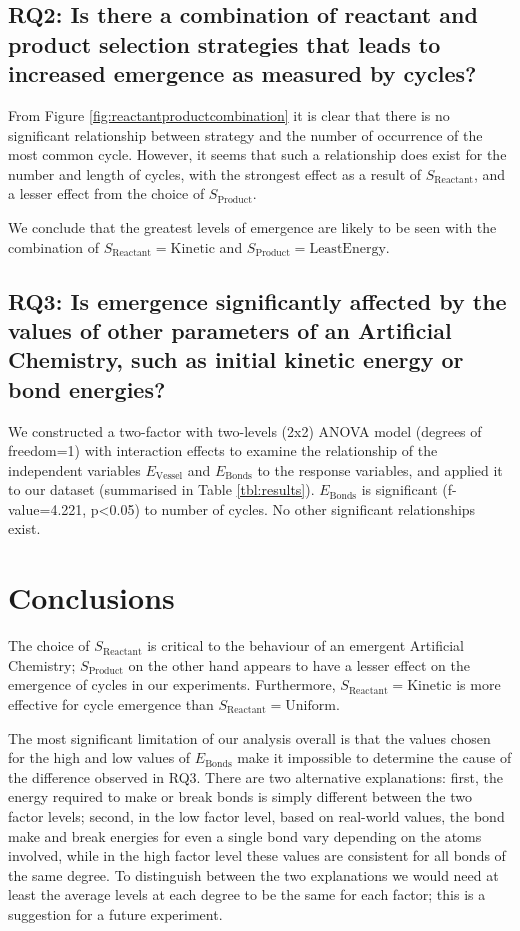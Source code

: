 \subsection{RQ2: Is there a combination of reactant and product selection strategies that leads to increased emergence as measured by cycles?}

From Figure \cref{fig:reactantproductcombination} it is clear that there is no significant relationship between strategy and the number of occurrence of the most common cycle. However, it seems that such a relationship does exist for the number and length of cycles, with the strongest effect as a result of $S_\mathrm{Reactant}$, and a lesser effect from the choice of $S_\mathrm{Product}$.

We conclude that the greatest levels of emergence are likely to be seen with the combination of $S_\mathrm{Reactant} = \mathrm{Kinetic}$ and $S_\mathrm{Product} = \mathrm{LeastEnergy}$.

\subsection{RQ3: Is emergence significantly affected by the values of other parameters of an Artificial Chemistry, such as initial kinetic energy or bond energies?}

We constructed a two-factor with two-levels (2x2) ANOVA model (degrees of freedom=1) with interaction effects to examine the relationship of the independent variables $E_\mathrm{Vessel}$ and $E_\mathrm{Bonds}$ to the response variables, and applied it to our dataset (summarised in Table \cref{tbl:results}). $E_\mathrm{Bonds}$ is significant (f-value=4.221, p\textless 0.05) to number of cycles. No other significant relationships exist.

\section{Conclusions}
The choice of $S_\mathrm{Reactant}$ is critical to the behaviour of an emergent Artificial Chemistry; $S_\mathrm{Product}$ on the other hand appears to have a lesser effect on the emergence of cycles in our experiments. Furthermore, $S_\mathrm{Reactant} = \mathrm{Kinetic}$ is more effective for cycle emergence than $S_\mathrm{Reactant} = \mathrm{Uniform}$.

The most significant limitation of our analysis overall is that the values chosen for the high and low values of $E_\mathrm{Bonds}$ make it impossible to determine the cause of the difference observed in RQ3. There are two alternative explanations: first, the energy required to make or break bonds is simply different between the two factor levels; second, in the low factor level, based on real-world values, the bond make and break energies for even a single bond vary depending on the atoms involved, while in the high factor level these values are consistent for all bonds of the same degree. To distinguish between the two explanations we would need at least the average levels at each degree to be the same for each factor; this is a suggestion for a future experiment.

